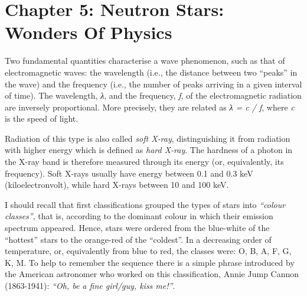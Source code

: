 \section*{Chapter 5: Neutron Stars: Wonders Of Physics}
\begin{description}[style=multiline,leftmargin=2em,labelwidth=1.5em]

\item[1.]\hypertarget{note:05-01}{}Two fundamental quantities characterise a wave phenomenon, such as that of
electromagnetic waves: the wavelength (i.e., the distance between two ``peaks'' in the
wave) and the frequency (i.e., the number of peaks arriving in a given interval of
time). The wavelength, \emph{λ}, and the frequency, \emph{f}, of the electromagnetic
radiation are inversely proportional. More precisely, they are
related as \emph{λ = c / f}, where \emph{c} is the speed of light.

\item[2.]\hypertarget{note:05-02}{}Radiation of this type is also called \emph{soft X-ray},
distinguishing it from radiation with higher energy which is defined as \emph{hard
X-ray}. The hardness of a photon in the X-ray band
is therefore measured through its energy (or, equivalently, its frequency). Soft X-rays
usually have energy between 0.1 and 0.3 keV (kiloelectronvolt), while hard X-rays
between 10 and 100 keV.

\item[3.]\hypertarget{note:05-03}{}I should recall that first classifications grouped the types of stars into
\emph{``colour classes''}, that is, according to the dominant colour in which their
emission spectrum appeared. Hence, stars were ordered from the
blue-white of the ``hottest'' stars to the orange-red of the ``coldest''. In a
decreasing order of temperature, or, equivalently from blue to red, the classes were: O,
B, A, F, G, K, M. To help to remember the sequence there is a simple phrase introduced
by the American astronomer who worked on this classification, Annie Jump Cannon
(1863-1941): \emph{``Oh, be a fine girl/guy, kiss me!''}.


\end{description}
